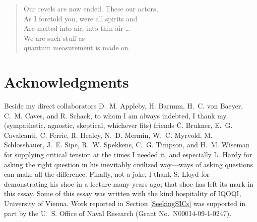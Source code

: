 \begin{flushright}
\baselineskip=13pt
\parbox{3.4in}{
\begin{verse}\small
Our revels are now ended.  These our actors, \\
As I foretold you, were all spirits and \\
Are melted into air, into thin air \smallskip \ldots \\
We are such stuff as \\
\hspace*{0.5cm} quantum measurement is made on.
\end{verse}}
\end{flushright}

\section{Acknowledgments}

{\small\baselineskip=13pt Beside my direct collaborators D.~M. Appleby, H. Barnum, H.~C. von Baeyer, C.~M. Caves, and R. Schack, to whom I am always indebted, I thank my (sympathetic, agnostic, skeptical, whichever fits) friends \v{C}. Brukner, E.~G. Cavalcanti, C. Ferrie, R. Healey, N.~D. Mermin, W.~C. Myrvold, M. Schlosshauer, J.~E. Sipe, R.~W. Spekkens, C.~G. Timpson, and H.~M. Wiseman for supplying critical tension at the times I needed it, and especially L. Hardy for asking the right question in his inevitably civilized way---ways of asking questions can make all the difference.  Finally, not a joke, I thank S. Lloyd for demonstrating his shoe in a lecture many years ago; that shoe has left its mark in this essay.  Some of this essay was written with the kind hospitality of IQOQI, University of Vienna.  Work reported in Section \ref{SeekingSICs} was supported in part by the U.~S. Office of Naval Research (Grant No.\ N00014-09-1-0247).}


